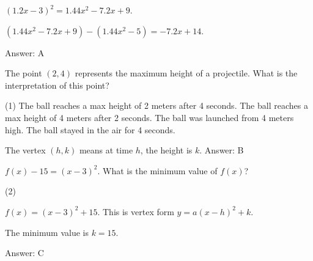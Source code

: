 \documentclass[11pt,paper=a4,answers]{exam}
\begin{document}
\begin{questions}
\begin{solution}
$(1.2x - 3)^2 = 1.44x^2 - 7.2x + 9$.
\vspace{5pt}
\begin{center}
$(1.44x^2 - 7.2x + 9) - (1.44x^2 - 5) = -7.2x + 14$.
\end{center}
\vspace{5pt}
Answer: \colorbox{yellow!100}{A}
\end{solution}

\vspace{1cm}

\question
\begin{center}
\end{center}
The point $(2, 4)$ represents the maximum height of a projectile. What is the interpretation of this point?
\begin{tasks}(1)
    \task The ball reaches a max height of 2 meters after 4 seconds.
    \task The ball reaches a max height of 4 meters after 2 seconds.
    \task The ball was launched from 4 meters high.
    \task The ball stayed in the air for 4 seconds.
\end{tasks}

\begin{solution}
The vertex $(h, k)$ means at time $h$, the height is $k$.
\vspace{5pt}
Answer: \colorbox{yellow!100}{B}
\end{solution}

\vspace{1cm}

\question
$f(x) - 15 = (x-3)^2$. What is the minimum value of $f(x)$?
\begin{tasks}(2)
       
\end{tasks}

\begin{solution}
$f(x) = (x-3)^2 + 15$. This is vertex form $y = a(x-h)^2 + k$.
\vspace{5pt}
\begin{center}
The minimum value is $k = 15$.
\end{center}
\vspace{5pt}
Answer: \colorbox{yellow!100}{C}
\end{solution}


\end{questions}
\end{document}
